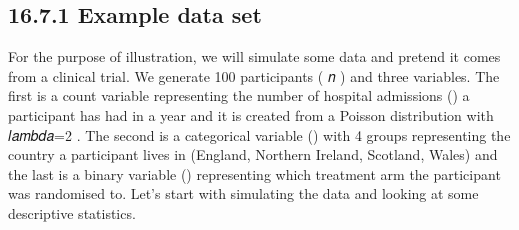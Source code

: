 \documentclass[letterpaper,10pt,english]{jupyterBook}
\begin{document}
\subsection{16.7.1 Example data set}
\label{\detokenize{16.h. Generalised Linear Model (GLM):example-data-set}}
\sphinxAtStartPar
For the purpose of illustration, we will simulate some data and pretend it comes from a clinical trial. We generate 100 participants ( 𝑛 ) and three variables. The first is a count variable representing the number of hospital admissions () a participant has had in a year and it is created from a Poisson distribution with  𝑙𝑎𝑚𝑏𝑑𝑎=2 . The second is a categorical variable () with 4 groups representing the country a participant lives in (England, Northern Ireland, Scotland, Wales) and the last is a binary variable () representing which treatment arm the participant was randomised to. Let’s start with simulating the data and looking at some descriptive statistics.

\begin{sphinxVerbatim}[commandchars=\\\{\}]
   
       
     
    
\end{sphinxVerbatim}
\end{document}
